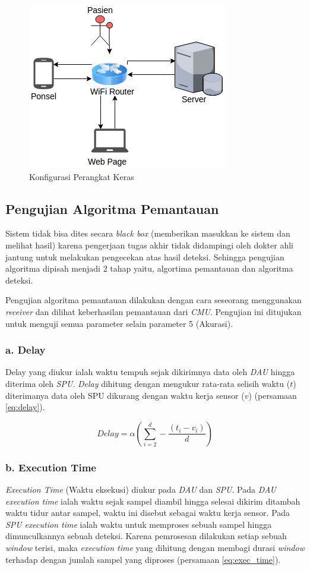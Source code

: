 \begin{figure}
	\centering
	\includegraphics[scale=0.82]{images/konfigurasi.png}
	\caption{Konfigurasi Perangkat Keras}
	\label{fig:konfigurasi}
\end{figure}

\subsection{Pengujian Algoritma Pemantauan}
Sistem tidak bisa dites secara \textit{black box} (memberikan masukkan ke sistem dan melihat hasil) karena pengerjaan tugas akhir tidak didampingi oleh dokter ahli jantung untuk melakukan pengecekan atas hasil deteksi. Sehingga pengujian algoritma dipisah menjadi  2 tahap yaitu, algortima pemantauan dan algoritma deteksi. 

Pengujian algoritma pemantauan dilakukan dengan cara seseorang menggunakan \textit{receiver} dan dilihat keberhasilan pemantauan dari \textit{CMU}. Pengujian ini ditujukan untuk menguji semua parameter selain parameter 5 (Akurasi).

\subsubsection{a. Delay}
Delay yang diukur ialah waktu tempuh sejak dikirimnya data oleh \textit{DAU} hingga diterima oleh \textit{SPU}. \textit{Delay} dihitung dengan mengukur rata-rata selisih waktu ($t$) diterimanya data oleh SPU dikurang dengan waktu kerja sensor ($v$) (persamaan \ref{eq:delay}).

\begin{equation}
Delay = \alpha (\sum_{i=2}^{d} -\frac{(t_{i} - v_{i})}{d})
\label{eq:delay} 
\end{equation}

\subsubsection{b. Execution Time}
\textit{Execution Time} (Waktu eksekusi) diukur pada \textit{DAU} dan \textit{SPU}. Pada \textit{DAU} \textit{execution time} ialah waktu sejak sampel diambil hingga selesai dikirim ditambah waktu tidur antar sampel, waktu ini disebut sebagai waktu kerja sensor. Pada \textit{SPU} \textit{execution time} ialah waktu untuk memproses sebuah sampel hingga dimunculkannya sebuah deteksi. Karena pemrosesan dilakukan setiap sebuah \textit{window} terisi, maka \textit{execution time} yang dihitung dengan membagi durasi \textit{window} terhadap dengan jumlah sampel yang diproses (persamaan \ref{eq:exec_time}).

